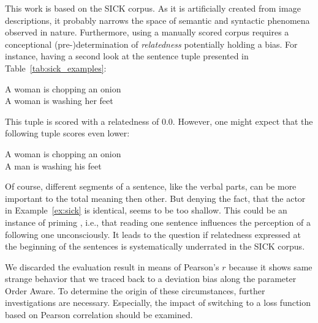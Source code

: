 This work is based on the SICK corpus. As it is artificially created from image descriptions, it probably narrows the space of semantic and syntactic phenomena observed in nature. Furthermore, using a manually scored corpus requires a conceptional (pre-)determination of \textit{relatedness} potentially holding a bias. For instance, having a second look at the sentence tuple presented in Table~\ref{tab:sick_examples}:
\begin{exe}
	\ex \label{ex:sick} A woman is chopping an onion \\
		A woman is washing her feet
\end{exe}
This tuple is scored with a relatedness of $0.0$. However, one might expect that the following tuple scores even lower:
\begin{exe}
	\ex \label{ex:no_sick} A woman is chopping an onion \\
		A man is washing his feet
\end{exe}
Of course, different segments of a sentence, like the verbal parts, can be more important to the total meaning then other. But denying the fact, that the actor in Example~\ref{ex:sick} is identical,  seems to be too shallow. This could be an instance of priming \autocite{weingarten_primed_2016}, i.e., that reading one sentence influences the perception of a following one unconsciously. It leads to the question if relatedness expressed at the beginning of the sentences is systematically underrated in the SICK corpus.

We discarded the evaluation result in means of Pearson's $r$ because it shows same strange behavior that we traced back to a deviation bias along the parameter Order Aware. To determine the origin of these circumstances, further investigations are necessary. Especially, the impact of switching to a loss function based on Pearson correlation should be examined.


